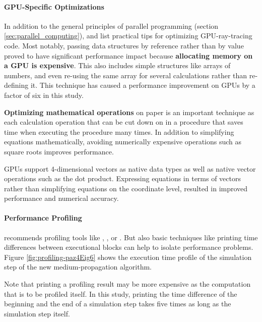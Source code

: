 \paragraph{GPU-Specific Optimizations}
In addition to the general principles of parallel programming (section \ref{sec:parallel_computing}),  and  \cite{raytracingtips} list practical tips for optimizing GPU-ray-tracing code.
Most notably, passing data structures by reference rather than by value proved to have significant performance impact because \textbf{allocating memory on a GPU is expensive}. This also includes simple structures like arrays of numbers, and even re-using the same array for several calculations rather than re-defining it. This technique has caused a performance improvement on GPUs by a factor of six in this study.


\textbf{Optimizing mathematical operations} on paper is an important technique as each calculation operation that can be cut down on in a procedure that saves time when executing the procedure many times. In addition to simplifying equations mathematically, avoiding numerically expensive operations such as square roots improves performance.

GPUs support 4-dimensional vectors as native data types as well as native vector operations such as the dot product. Expressing equations in terms of vectors rather than simplifying equations on the coordinate level, resulted in improved performance and numerical accuracy.



\paragraph{Performance Profiling}
 recommends profiling tools like , , or  \cite{cudacourse}. But also basic techniques like printing time differences between executional blocks can help to isolate performance problems. Figure \ref{fig:profiling-paz4Eig6} shows the execution time profile of the simulation step of the new medium-propagation algorithm.

Note that printing a profiling result may be more expensive as the computation that is to be profiled itself. In this study, printing the time difference of the beginning and the end of a simulation step takes five times as long as the simulation step itself.

